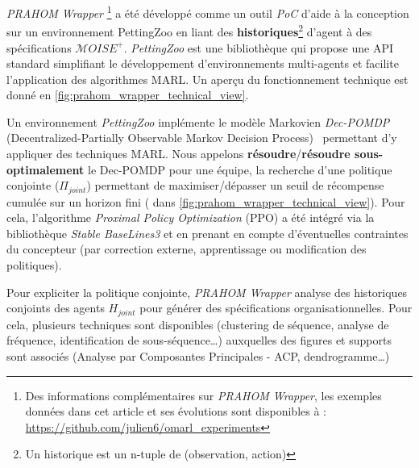 \documentclass[demonstration]{jfsma}
\newcommand{\jp}[1]{\textbf{\color{red} JPJ: #1}}
\begin{document}
\emph{PRAHOM Wrapper}\label{PettingZoo-wrapper}
\footnote{Des informations complémentaires sur \emph{PRAHOM Wrapper}, les exemples données dans cet article et ses évolutions sont disponibles à : \url{https://github.com/julien6/omarl_experiments}}
a été développé comme un outil \emph{PoC} d'aide à la conception sur un environnement PettingZoo en liant des \textbf{historiques}\footnote{Un historique est un n-tuple de (observation, action)} d'agent à des spécifications $\mathcal{M}OISE^+$. \emph{PettingZoo} est une bibliothèque qui propose une API standard simplifiant le développement d'environnements multi-agents et facilite l'application des algorithmes MARL. Un aperçu du fonctionnement technique est donné en \autoref{fig:prahom_wrapper_technical_view}. 

Un environnement
\emph{PettingZoo} implémente le modèle Markovien \emph{Dec-POMDP} (Decentralized-Partially Observable Markov Decision Process)~\cite{Oliehoek2016} permettant d'y appliquer
des techniques MARL. 
Nous appelons \textbf{résoudre}/\textbf{résoudre sous-optimalement} le Dec-POMDP pour une équipe, la recherche d'une politique conjointe ($\Pi_{joint}$) permettant de maximiser/dépasser un seuil de récompense cumulée sur un horizon fini ( dans \autoref{fig:prahom_wrapper_technical_view}). Pour cela, l'algorithme \emph{Proximal Policy Optimization} (PPO) a été intégré via la bibliothèque \emph{Stable BaseLines3} et en prenant en compte d'éventuelles contraintes du concepteur (par correction externe, apprentissage ou modification des politiques).


Pour expliciter la politique conjointe, \emph{PRAHOM Wrapper} analyse des historiques conjoints des agents $H_{joint}$ pour générer des spécifications organisationnelles. Pour cela, plusieurs techniques sont disponibles (clustering de séquence, analyse de fréquence, identification de sous-séquence\dots) auxquelles des figures et supports sont associés (Analyse par Composantes Principales - ACP, dendrogramme\dots)
\end{document}
